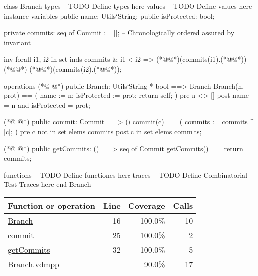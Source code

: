 \begin{vdmpp}[breaklines=true]
class Branch
 types
 -- TODO Define types here
 values
 -- TODO Define values here
 instance variables
  public name: Utils`String;
  public isProtected: bool;
 
  private commits: seq of Commit := []; -- Chronologically ordered assured by invariant
 
  inv forall i1, i2 in set inds commits & 
   i1 < i2 => (*@@*)(commits(i1).(*@@*)) (*@\vdmnotcovered{<}@*) (*@@*)(commits(i2).(*@@*));
  
 operations
(*@
\label{Branch:16}
@*)
  public Branch: Utils`String * bool ==> Branch
  Branch(n, prot) == (
   name := n;
   isProtected := prot;
   return self;
  )
  pre n <> []
  post name = n and isProtected = prot;
  
(*@
\label{commit:25}
@*)
  public commit: Commit ==> ()
  commit(c) == (
   commits := commits ^ [c];
  )
  pre c not in set elems commits
  post c in set elems commits;
  
(*@
\label{getCommits:32}
@*)
  public getCommits: () ==> seq of Commit
  getCommits() == return commits;
  
 functions
 -- TODO Define functiones here
 traces
 -- TODO Define Combinatorial Test Traces here
end Branch
\end{vdmpp}
\bigskip
\begin{longtable}{|l|r|r|r|}
\hline
Function or operation & Line & Coverage & Calls \\
\hline
\hline
\hyperref[Branch:16]{Branch} & 16&100.0\% & 10 \\
\hline
\hyperref[commit:25]{commit} & 25&100.0\% & 2 \\
\hline
\hyperref[getCommits:32]{getCommits} & 32&100.0\% & 5 \\
\hline
\hline
Branch.vdmpp & & 90.0\% & 17 \\
\hline
\end{longtable}

